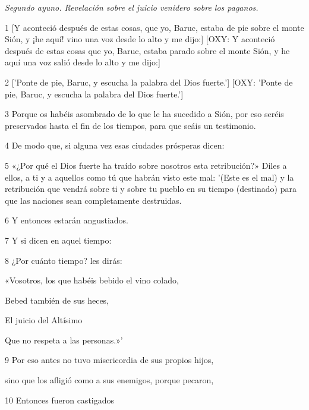 \par \textit{Segundo ayuno. Revelación sobre el juicio venidero sobre los paganos.}

\par 1 [Y aconteció después de estas cosas, que yo, Baruc, estaba de pie sobre el monte Sión, y ¡he aquí! vino una voz desde lo alto y me dijo:] [OXY: Y aconteció después de estas cosas que yo, Baruc, estaba parado sobre el monte Sión, y he aquí una voz salió desde lo alto y me dijo:]

\par 2 ['Ponte de pie, Baruc, y escucha la palabra del Dios fuerte.'] [OXY: 'Ponte de pie, Baruc, y escucha la palabra del Dios fuerte.']

\par 3 Porque os habéis asombrado de lo que le ha sucedido a Sión, por eso seréis preservados hasta el fin de los tiempos, para que seáis un testimonio.

\par 4 De modo que, si alguna vez esas ciudades prósperas dicen:

\par 5 «¿Por qué el Dios fuerte ha traído sobre nosotros esta retribución?» Diles a ellos, a ti y a aquellos como tú que habrán visto este mal: '(Este es el mal) y la retribución que vendrá sobre ti y sobre tu pueblo en su tiempo (destinado) para que las naciones sean completamente destruidas.

\par 6 Y entonces estarán angustiados.

\par 7 Y si dicen en aquel tiempo:

\par 8 ¿Por cuánto tiempo? les dirás:

\par «Vosotros, los que habéis bebido el vino colado,

Bebed también de sus heces,

\par El juicio del Altísimo

\par Que no respeta a las personas.»'

\par 9 Por eso antes no tuvo misericordia de sus propios hijos,

sino que los afligió como a sus enemigos, porque pecaron,

\par 10 Entonces fueron castigados

